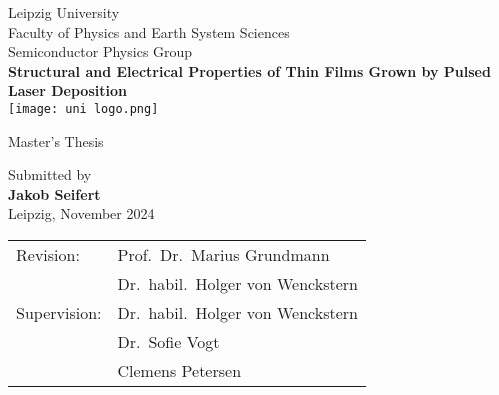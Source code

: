 \thispagestyle{empty}
\begin{center}
        \vspace{0.5cm}
        \large
        Leipzig University\\
        Faculty of Physics and Earth System Sciences\\
        Semiconductor Physics Group\\[1.5cm]
        \Huge
        \textbf{
            Structural and Electrical Properties of
            \texorpdfstring{\cro}{Cr2O3}
            Thin Films Grown by Pulsed Laser Deposition
            }\\[1.2cm]

        \texttt{[image: uni logo.png]}\\

        \vspace{.8cm}
        
    
        \LARGE
        Master's Thesis\\
        
            
        \vspace{1cm}

        \large
        Submitted by\\
        \LARGE
        \textbf{Jakob Seifert}\\[.5cm]
        \large
        Leipzig, November 2024
        
        \vfill
            
            
        \vspace{0.8cm}
            
            
        \large
        \centering
        \begin{tabular}{ll}
            \toprule
            Revision:       & Prof.\ Dr.\ Marius Grundmann\\
                            & Dr.\ habil.\ Holger von Wenckstern\\[1cm]
            Supervision:    & Dr.\ habil.\ Holger von Wenckstern\\
                            & Dr.\ Sofie Vogt\\
                            & Clemens Petersen
        \end{tabular}
        
        
        
            
    \end{center}

\restoregeometry